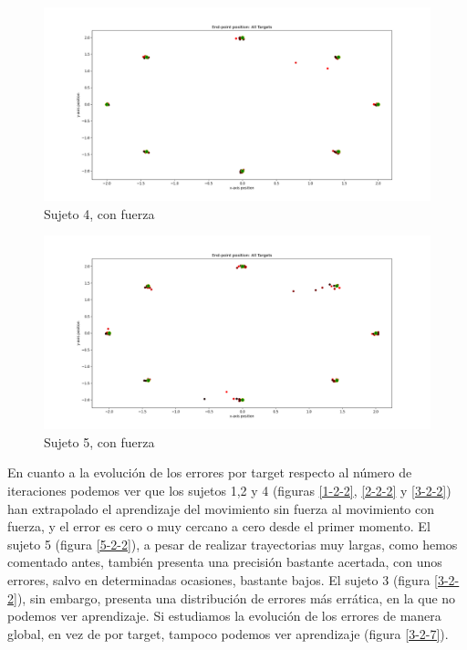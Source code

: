 \documentclass[a4paper,11pt, oneside]{book}
\begin{document}
\begin{figure}[H]
	\includegraphics[width=\linewidth]{sujeto4/force/trayectorias_puntos}
	\caption{Sujeto 4, con fuerza}
	\label{4-2-1}
\end{figure}
\begin{figure}[H]
	\includegraphics[width=\linewidth]{sujeto5/force/trayectorias_puntos}
	\caption{Sujeto 5, con fuerza}
	\label{5-2-1}
\end{figure}


En cuanto a la evolución de los errores por target respecto al número de iteraciones podemos ver que los sujetos 1,2 y 4 (figuras \ref{1-2-2}, \ref{2-2-2} y \ref{3-2-2}) han extrapolado el aprendizaje del movimiento sin fuerza al movimiento con fuerza, y el error es cero o muy cercano a cero desde el primer momento. El sujeto 5 (figura \ref{5-2-2}), a pesar de realizar trayectorias muy largas, como hemos comentado antes, también presenta una precisión bastante acertada, con unos errores, salvo en determinadas ocasiones, bastante bajos. 
El sujeto 3 (figura \ref{3-2-2}), sin embargo, presenta una distribución de  errores más errática, en la que no podemos ver aprendizaje. Si estudiamos la evolución de los errores de manera global, en vez de por target, tampoco podemos ver aprendizaje (figura \ref{3-2-7}).
\end{document}
